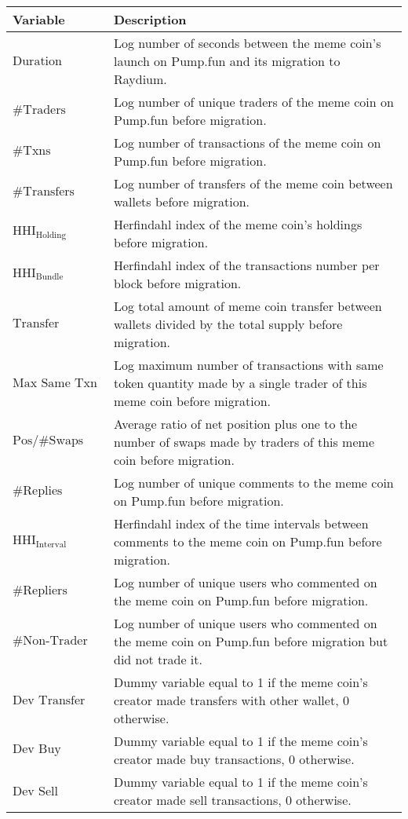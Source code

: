 \begin{tabularx}{\textwidth}{lX}\hline
Variable & Description \\
\hline
$\text{Duration}$ & Log number of seconds between the meme coin's launch on Pump.fun and its migration to Raydium. \\
$\#\text{Traders}$ & Log number of unique traders of the meme coin on Pump.fun before migration. \\
$\#\text{Txns}$ & Log number of transactions of the meme coin on Pump.fun before migration. \\
$\#\text{Transfers}$ & Log number of transfers of the meme coin between wallets before migration. \\
$\text{HHI}_{\text{Holding}}$ & Herfindahl index of the meme coin's holdings before migration. \\
$\text{HHI}_{\text{Bundle}}$ & Herfindahl index of the transactions number per block before migration. \\
$\text{Transfer Amount (\%)}$ & Log total amount of meme coin transfer between wallets divided by the total supply before migration. \\
$\text{Max Same Txn}$ & Log maximum number of transactions with same token quantity made by a single trader of this meme coin before migration. \\
$\text{Pos/\#Swaps}$ & Average ratio of net position plus one to the number of swaps made by traders of this meme coin before migration. \\
$\#\text{Replies}$ & Log number of unique comments to the meme coin on Pump.fun before migration. \\
$\text{HHI}_{\text{Interval}}$ & Herfindahl index of the time intervals between comments to the meme coin on Pump.fun before migration. \\
$\#\text{Repliers}$ & Log number of unique users who commented on the meme coin on Pump.fun before migration. \\
$\#\text{Non-Trader Repliers}$ & Log number of unique users who commented on the meme coin on Pump.fun before migration but did not trade it. \\
$\text{Dev Transfer}$ & Dummy variable equal to 1 if the meme coin's creator made transfers with other wallet, 0 otherwise. \\
$\text{Dev Buy}$ & Dummy variable equal to 1 if the meme coin's creator made buy transactions, 0 otherwise. \\
$\text{Dev Sell}$ & Dummy variable equal to 1 if the meme coin's creator made sell transactions, 0 otherwise. \\
\hline
\end{tabularx}
